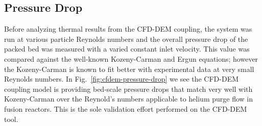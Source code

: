 \subsection{Pressure Drop}

Before analyzing thermal results from the CFD-DEM coupling, the system was run at various particle Reynolds numbers and the overall pressure drop of the packed bed was measured with a varied constant inlet velocity. This value was compared against the well-known Kozeny-Carman and Ergun equations; however the Kozeny-Carman is known to fit better with experimental data at very small Reynolds numbers. In Fig.~\ref{fig:cfdem-pressure-drop} we see the CFD-DEM coupling model is providing bed-scale pressure drops that match very well with Kozeny-Carman over the Reynold’s numbers applicable to helium purge flow in fusion reactors. This is the sole validation effort performed on the CFD-DEM tool.

